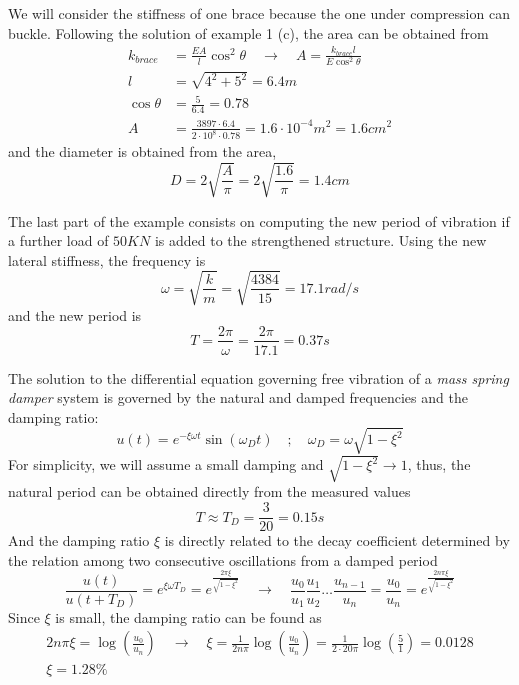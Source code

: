 We will consider the stiffness of one brace because the one under compression can buckle. 
Following the solution of example 1 (c), the area can be obtained from
\begin{align*}
k_{brace} &= \frac{EA}{l}\cos^2\theta \quad \rightarrow \quad A = \frac{k_{brace}l}{E\cos^2\theta} \\
l &= \sqrt{4^2 + 5^2} = 6.4m \\
\cos\theta &= \frac{5}{6.4} = 0.78 \\
A &= \frac{3897\cdot 6.4}{2\cdot 10^8\cdot 0.78} = 1.6\cdot 10^{-4} m^2 = 1.6cm^2
\end{align*}
and the diameter is obtained from the area,
$$
D = 2\sqrt{\frac{A}{\pi}} = 2\sqrt{\frac{1.6}{\pi}} = 1.4cm
$$

The last part of the example consists on computing the new period of vibration if a further load of $50KN$ is added to the strengthened structure. Using the new lateral stiffness, the frequency is
$$
\omega = \sqrt{\frac{k}{m}} = \sqrt{\frac{4384}{15}} = 17.1 rad/s
$$
and the new period is
$$
T = \frac{2\pi}{\omega} = \frac{2\pi}{17.1} = 0.37s
$$



The solution to the differential equation governing free vibration of a \emph{mass spring damper} system is governed by the natural and damped frequencies and the damping ratio:
$$
u(t) = e^{-\xi\omega t}\sin(\omega_D t) \quad ; \quad \omega_D = \omega\sqrt{1-\xi^2}
$$
For simplicity, we will assume a small damping and $\sqrt{1-\xi^2}\rightarrow1$, thus, the natural period can be obtained directly from the measured values
$$
T \approx T_D = \frac{3}{20} = 0.15s
$$
And the damping ratio $\xi$ is directly related to the decay coefficient determined by the relation among two consecutive oscillations from a damped period
$$
\frac{u(t)}{u(t+T_D)} = e^{\xi\omega T_D} = e^{\frac{2\pi\xi}{\sqrt{1-\xi^2}}} \quad \rightarrow \quad
\frac{u_0}{u_1} \frac{u_1}{u_2} \dots \frac{u_{n-1}}{u_n} = \frac{u_0}{u_n} = e^{\frac{2n\pi\xi}{\sqrt{1-\xi^2}}}
$$
Since $\xi$ is small, the damping ratio can be found as
\begin{align*}
2n\pi\xi = \log\left(\frac{u_0}{u_n}\right) \quad \rightarrow \quad
\xi = \frac{1}{2n\pi} \log\left(\frac{u_0}{u_n}\right) = \frac{1}{2\cdot20\pi} \log\left(\frac{5}{1}\right) = 0.0128 \\
\xi = 1.28\%
\end{align*}
